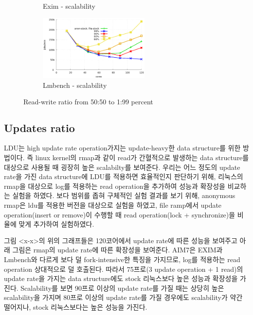 \begin{figure}[t!]
\begin{subfigure}[b]{0.33\textwidth}
        \caption{Exim - scalability}
    \end{subfigure}
    \begin{subfigure}[b]{0.33\textwidth}
        \includegraphics[height=1.3in]{graph/ratio_lmbench_core.eps}
        \caption{Lmbench - scalability}
    \end{subfigure}
    \caption{Read-write ratio from 50:50 to 1:99 percent}
    
\end{figure}

\subsection{Updates ratio}



\ifkor
LDU는 high update rate operation가지는 update-heavy한 data structure를 위한 방법이다.
즉 linux kernel의 rmap과 같이 read가 간혈적으로 발생하는 data structure를 대상으로 사용될 때 굉장히 높은
scalabilty를 보여준다.
우리는 어느 정도의 update rate을 가진 data structure에 LDU를 적용하면 효율적인지
판단하기 위해, 리눅스의 rmap을 대상으로 log를 적용하는 read operation을 추가하여 성능과 확장성을 비교하는 실험을 하였다. 
보다 범위를 좁혀 구체적인 실험 결과를 보기 위해, anonymous rmap은 ldu를 적용한 버전을 대상으로 실험을 하였고,
file ramp에서 update operation(insert or remove)이 수행할 때 read operation(lock +
synchronize)을 비율에 맞게 추가하여 실험하였다.

\else

\fi
\ifkor
그림 <x-x>의 위의 그래프들은 120코어에서 update rate에 따른 성능을 보여주고 아래 그림은
rmap의 update rate에 따른 확장성을 보여준다. 
AIM7은 EXIM과 Lmbench와 다르게 보다 덜 fork-intensive한 특징을 가지므로, log를 적용하는
read operation 상대적으로 덜 호출된다.
따라서 75프로(3 update operation + 1 read)의 update rate을 가지는 data structure에도 stock
리눅스보다 높은 성능과 확장성을 가진다.
Scalability를 보면 90프로 이상의 update rate를 가질 때는 상당히 높은 scalability을 가지며 
80프로 이상의 update rate를 가질 경우에도 scalability가 약간 떨어지나, stock 리눅스보다는
높은 성능을 가진다. 

